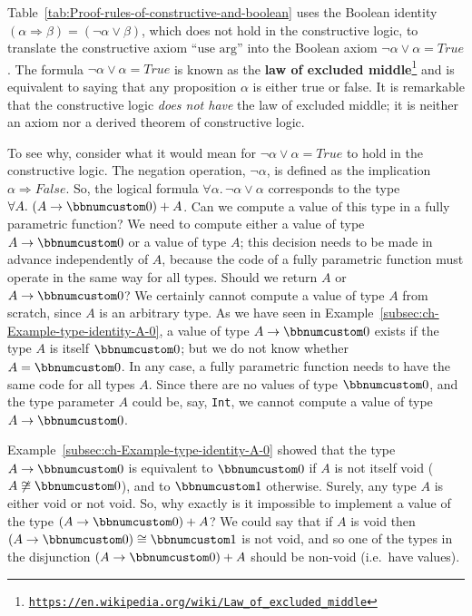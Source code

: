 Table~\ref{tab:Proof-rules-of-constructive-and-boolean} uses the
Boolean identity $\left(\alpha\Rightarrow\beta\right)=(\neg\alpha\vee\beta)$,
which does not hold in the constructive logic, to translate the constructive
axiom \textsf{``}$\text{use arg}$\textsf{''} into the Boolean axiom $\neg\alpha\vee\alpha=True$.
The formula $\neg\alpha\vee\alpha=True$ is known as the \textbf{law
of excluded middle}\footnote{\texttt{\href{https://en.wikipedia.org/wiki/Law_of_excluded_middle}{https://en.wikipedia.org/wiki/Law\_of\_excluded\_middle}}}
and is equivalent to saying that any proposition $\alpha$ is either
true or false. It is remarkable that the constructive logic \emph{does
not have} the law of excluded middle; it is neither an axiom nor a
derived theorem of constructive logic. 

To see why, consider what it would mean for $\neg\alpha\vee\alpha=True$
to hold in the constructive logic. The negation operation, $\neg\alpha$,
is defined as the implication $\alpha\Rightarrow False$. So, the
logical formula $\forall\alpha.\,\neg\alpha\vee\alpha$ corresponds
to the type $\forall A.\,\left(A\rightarrow\bbnum 0\right)+A$. Can
we compute a value of this type in a fully parametric function? We
need to compute either a value of type $A\rightarrow\bbnum 0$ or
a value of type $A$; this decision needs to be made in advance independently
of $A$, because the code of a fully parametric function must operate
in the same way for all types. Should we return $A$ or $A\rightarrow\bbnum 0$?
We certainly cannot compute a value of type $A$ from scratch, since
$A$ is an arbitrary type. As we have seen in Example~\ref{subsec:ch-Example-type-identity-A-0},
a value of type $A\rightarrow\bbnum 0$ exists if the type $A$ is
itself $\bbnum 0$; but we do not know whether $A=\bbnum 0$. In any
case, a fully parametric function needs to have the same code for
all types $A$. Since there are no values of type $\bbnum 0$, and
the type parameter $A$ could be, say, \lstinline!Int!, we cannot
compute a value of type $A\rightarrow\bbnum 0$.

Example~\ref{subsec:ch-Example-type-identity-A-0} showed that the
type $A\rightarrow\bbnum 0$ is equivalent to $\bbnum 0$ if $A$
is not itself void ($A\not\cong\bbnum 0$), and to $\bbnum 1$ otherwise.
Surely, any type $A$ is either void or not void. So, why exactly
is it impossible to implement a value of the type $\left(A\rightarrow\bbnum 0\right)+A$?
We could say that if $A$ is void then $\left(A\rightarrow\bbnum 0\right)\cong\bbnum 1$
is not void, and so one of the types in the disjunction $\left(A\rightarrow\bbnum 0\right)+A$
should be non-void (i.e.~have values).


